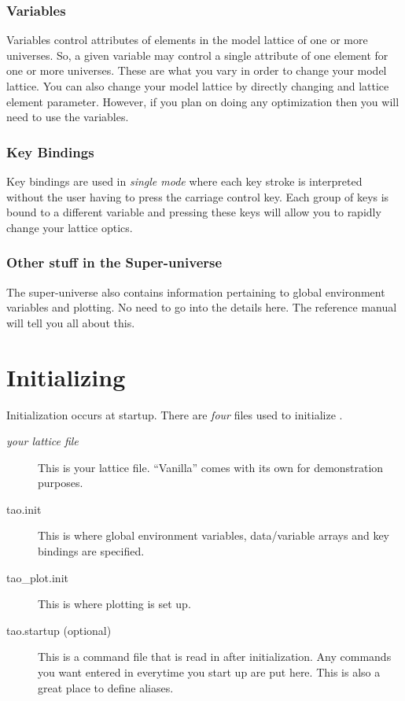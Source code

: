\documentclass{report}
\begin{document}
\subsection{Variables}

Variables control attributes of elements in the model lattice of one or more
universes. So, a given variable may control a single attribute of one element
for one or more universes. These are what you vary in order to change
your model lattice. You can also change your model lattice by directly changing
and lattice element parameter. However, if you plan on doing any optimization then 
you will need to use the variables.

\subsection{Key Bindings}

Key bindings are used in \textit{single mode} where each key
stroke is interpreted without the user having to press the carriage control key.
Each group of keys is bound to a different variable and pressing these keys will
allow you to rapidly change your lattice optics.

\subsection{Other stuff in the Super-universe}

The super-universe also contains information pertaining to global environment variables and
plotting. No need to go into the details here. The \tao reference manual will
tell you all about this.

\chapter{Initializing \tao}
\label{c:initializing}

Initialization occurs at startup. There are \emph{four} files used to initialize \tao.
  \vspace*{-3ex}
\begin{description}
  \item[\textit{your lattice file}] \Newline
    This is your lattice file. ``Vanilla'' \tao comes with its own for
demonstration purposes.
  \item[tao.init] \Newline 
    This is where global environment variables, data/variable
arrays and key bindings are specified.
  \item[tao\_plot.init] \Newline
    This is where plotting is set up.
  \item[tao.startup (optional)] \Newline
    This is a command file that is read in after initialization. Any commands you
want entered in \tao everytime you start up are put here. This is also a great
place to define aliases.
\end{description}
\end{document}
